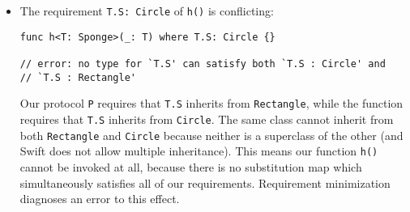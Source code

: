 \documentclass[../generics]{subfiles}
\begin{document}
\begin{example}
\begin{itemize}
\item The requirement \verb|T.S: Circle| of \texttt{h()} is conflicting:
\begin{Verbatim}
func h<T: Sponge>(_: T) where T.S: Circle {}

// error: no type for `T.S' can satisfy both `T.S : Circle' and
// `T.S : Rectangle'
\end{Verbatim}
Our protocol \texttt{P} requires that \texttt{T.S} inherits from \texttt{Rectangle}, while the function requires that \texttt{T.S} inherits from \texttt{Circle}. The same class cannot inherit from both \texttt{Rectangle} and \texttt{Circle} because neither is a superclass of the other (and Swift does not allow multiple inheritance). This means our function \texttt{h()} cannot be invoked at all, because there is no substitution map which simultaneously satisfies all of our requirements. Requirement minimization diagnoses an error to this effect.
\end{itemize}
\end{example}
\end{document}
